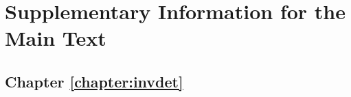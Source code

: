 \appendix
\rohead{\headmark}
\lehead{\headmark}


\renewcommand{\chapterformat}{\raggedleft \colorbox{prussianblue}{%
\centering\textit{\textcolor{white}{{\Large Appendix} {\Huge \thechapter}}}}}

\chapter{Supplementary Information for the Main Text}

\section{Chapter \ref*{chapter:invdet}}
\label{section:invdetappend}

